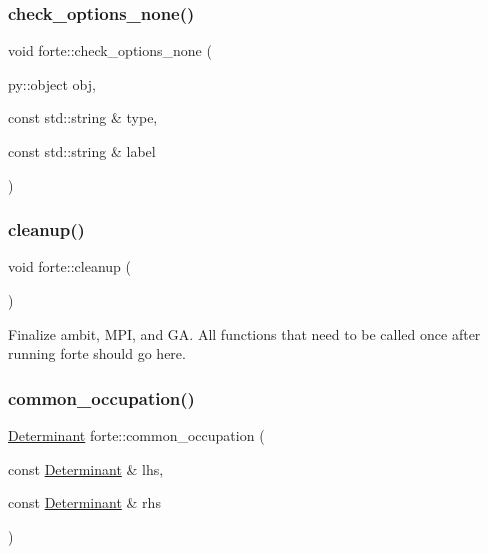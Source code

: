 \subsubsection{\texorpdfstring{check\+\_\+options\+\_\+none()}{check\_options\_none()}}
{\footnotesize\ttfamily void forte\+::check\+\_\+options\+\_\+none (\begin{DoxyParamCaption}\item[{py\+::object}]{obj,  }\item[{const std\+::string \&}]{type,  }\item[{const std\+::string \&}]{label }\end{DoxyParamCaption})}

\mbox{\label{namespaceforte_a39f3331bc7d13194f570cf4c712380f7}} 
\subsubsection{\texorpdfstring{cleanup()}{cleanup()}}
{\footnotesize\ttfamily void forte\+::cleanup (\begin{DoxyParamCaption}{ }\end{DoxyParamCaption})}



Finalize ambit, M\+PI, and GA. All functions that need to be called once after running forte should go here. 

\mbox{\label{namespaceforte_a2f094bc34c845c35c77772f8205e69c7}} 
\subsubsection{\texorpdfstring{common\+\_\+occupation()}{common\_occupation()}}
{\footnotesize\ttfamily \mbox{\hyperlink{namespaceforte_a2076c63fd7b8732004d9e1442ce527c1}{Determinant}} forte\+::common\+\_\+occupation (\begin{DoxyParamCaption}\item[{const \mbox{\hyperlink{namespaceforte_a2076c63fd7b8732004d9e1442ce527c1}{Determinant}} \&}]{lhs,  }\item[{const \mbox{\hyperlink{namespaceforte_a2076c63fd7b8732004d9e1442ce527c1}{Determinant}} \&}]{rhs }\end{DoxyParamCaption})}

